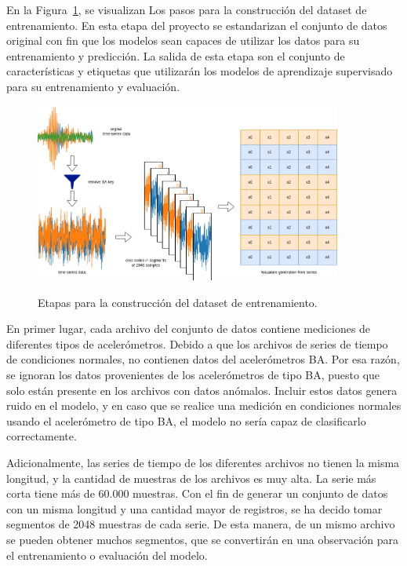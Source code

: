 \documentclass[11pt,a4paper,spanish]{book}
\numberwithin{equation}{chapter}
\numberwithin{figure}{chapter}
\begin{document}
En la Figura~\ref{fig:figGenerationDataset}, se visualizan Los pasos para la construcción 
del dataset de entrenamiento. 
En esta etapa del proyecto se estandarizan el conjunto de datos original con fin que los 
modelos sean 
capaces de utilizar los datos para su entrenamiento y predicción. La salida de esta etapa
son el conjunto de características y etiquetas que utilizarán los modelos de aprendizaje 
supervisado para su entrenamiento y evaluación. 


\begin{figure}[h]
    \caption{Etapas para la construcción del dataset de entrenamiento.}
    \centering
    \includegraphics[width=0.9\textwidth]{media/generacion-dataset.drawio.png}
    \label{fig:figGenerationDataset}
\end{figure}


En primer lugar, cada archivo del conjunto de datos contiene mediciones de diferentes 
tipos de acelerómetros. Debido a que los archivos de series de tiempo de condiciones 
normales, no contienen datos del acelerómetros BA. Por esa razón, se ignoran los datos 
provenientes de los acelerómetros de tipo BA, puesto que solo están presente en los 
archivos con datos anómalos. Incluir estos datos genera ruido en el modelo, y en caso 
que se realice una medición en condiciones normales usando el acelerómetro de tipo BA, 
el modelo no sería capaz de clasificarlo correctamente.


Adicionalmente, las series de tiempo de los diferentes archivos no tienen la misma 
longitud, y la cantidad de muestras de los archivos es muy alta. La serie más corta 
tiene más de 60.000 muestras. Con el fin de generar un conjunto de datos con un misma 
longitud y una cantidad mayor de registros, se ha decido tomar segmentos de 2048 
muestras de cada serie.  De esta manera, de un mismo archivo se pueden obtener muchos 
segmentos, que se convertirán en una observación para el entrenamiento o evaluación 
del modelo. 
\end{document}
